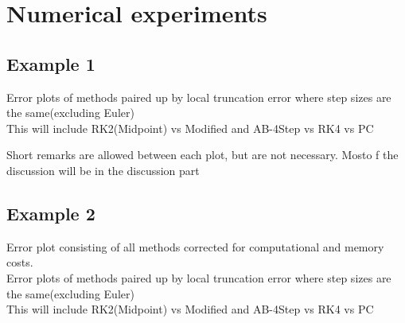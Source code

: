 \documentclass[11pt]{article}	%
\begin{document}

\section{Numerical experiments}

\subsection{Example 1}
Error plots of methods paired up by local truncation error where step sizes are the same(excluding Euler)   \\
\hspace{2cm} This will include RK2(Midpoint) vs Modified and AB-4Step vs RK4 vs PC

Short remarks are allowed between each plot, but are not necessary. Mosto f the discussion will be in the discussion part


\subsection{Example 2}
Error plot consisting of all methods corrected for computational and memory costs.\\
Error plots of methods paired up by local truncation error where step sizes are the same(excluding Euler)   \\
\hspace{2cm} This will include RK2(Midpoint) vs Modified and AB-4Step vs RK4 vs PC
\end{document}
